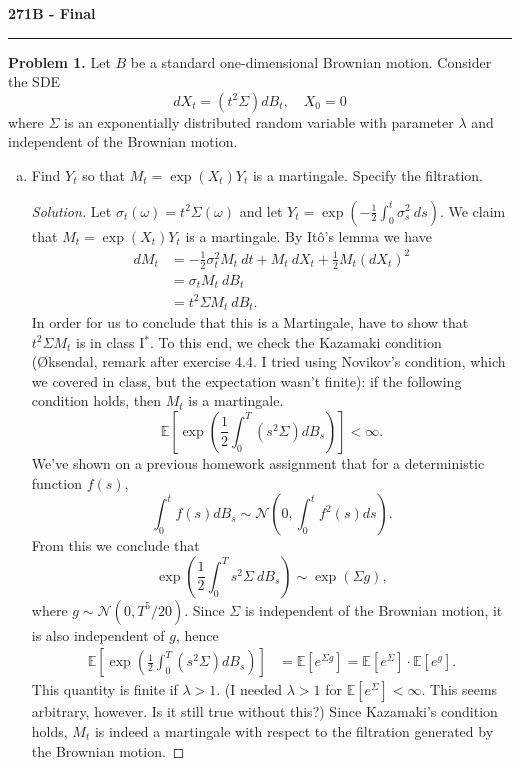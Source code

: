 \documentclass[11pt,letterpaper]{report}
\newcommand{\mcal}[1]{\mathcal{#1}}
\newcommand{\E}{\mathbb{E}}
\newenvironment{solution}
{\begin{proof}[Solution]}
{\end{proof}}
\begin{document}
\begin{center}
{\bf \Large 271B - Final}
\vspace{0.2cm}
\hrule
\end{center}

\noindent\textbf{Problem 1. }
Let $B$ be a standard one-dimensional Brownian motion. Consider the SDE
\begin{equation}\label{1_sde}
	dX_t = (t^2\Sigma)dB_t,\quad X_0 = 0
\end{equation}
where $\Sigma$ is an exponentially distributed random variable with parameter $\lambda$ and independent of the Brownian motion.
\begin{enumerate}[(a)]
	\item Find $Y_t$ so that $M_t = \exp(X_t)Y_t$ is a martingale. Specify the filtration.
	\begin{solution}
		Let $\sigma_t(\omega) = t^2\Sigma(\omega)$ and let $Y_t = \exp(-\frac{1}{2}\int_0^t\sigma^2_s\ ds)$. We claim that $M_t = \exp(X_t)Y_t$ is a martingale. By It\^o's lemma we have
		\begin{align*}
			dM_t &= -\frac{1}{2}\sigma_t^2M_t\ dt + M_t\ dX_t + \frac{1}{2}M_t(dX_t)^2\\
			&= \sigma_tM_t\ dB_t\\
			&= t^2\Sigma M_t\ dB_t.
		\end{align*}
		In order for us to conclude that this is a Martingale, have to show that $t^2\Sigma M_t$ is in class I$^*$. To this end, we check the Kazamaki condition (\O ksendal, remark after exercise 4.4. I tried using Novikov's condition, which we covered in class, but the expectation wasn't finite): if the following condition holds, then $M_t$ is a martingale.
		\begin{equation}\label{Novikov}
			\E\left[\exp\left( \frac{1}{2}\int_0^T(s^2\Sigma)dB_s \right) \right]<\infty.
		\end{equation}
		We've shown on a previous homework assignment that for a deterministic function $f(s)$,
		\[
		\int_0^tf(s)dB_s \sim \mcal{N}\left(0, \int_0^tf^2(s)ds \right).
		\]
		From this we conclude that
		\[
		\exp\left(\frac{1}{2}\int_0^Ts^2\Sigma\ dB_s\right)\sim \exp(\Sigma g),
		\]
		where $g\sim \mcal{N}(0, T^5/20)$. Since $\Sigma$ is independent of the Brownian motion, it is also independent of $g$, hence
		\begin{align*}
			\E\left[\exp\left( \frac{1}{2}\int_0^T(s^2\Sigma)dB_s \right) \right] &= \E[e^{\Sigma g}] = \E[e^\Sigma]\cdot \E[e^g].
		\end{align*}
		This quantity is finite if $\lambda>1$. (I needed $\lambda > 1$ for $\E[e^\Sigma]<\infty$. This seems arbitrary, however. Is it still true without this?) Since Kazamaki's condition holds, $M_t$ is indeed a martingale with respect to the filtration generated by the Brownian motion.
	\end{solution}


\end{enumerate}
\end{document}
